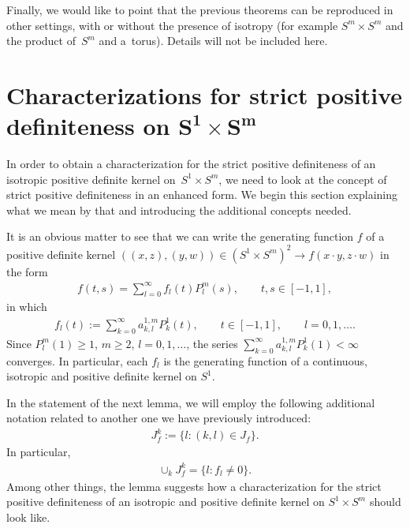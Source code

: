 \documentclass[pdftex]{sigma}
\numberwithin{equation}{section}
\begin{document}
Finally, we would like to point that the previous theorems can be reproduced in other settings, with or without the presence of isotropy (for example $S^m \times S^m$ and the product of~$S^m$ and a~torus). Details will not be included here.

\section[Characterizations for strict positive def\/initeness on $S^1 \times S^m$]{Characterizations for strict positive def\/initeness on $\boldsymbol{S^1 \times S^m}$}\label{section3}

In order to obtain a characterization for the strict positive def\/initeness of an isotropic positive def\/inite kernel on~$S^1 \times S^m$, we need to look at the concept of strict positive def\/initeness in an enhanced form. We begin this section explaining what we mean by that and introducing the additional concepts needed.

It is an obvious matter to see that we can write the generating function $f$ of a positive def\/inite kernel $((x,z), (y,w)) \in (S^1 \times S^m)^2 \to f(x \cdot y, z \cdot w)$ in the form
\begin{gather} \label{alter}
f(t,s)=\sum_{l=0}^{\infty}f_l(t)P_{l}^{m}(s), \qquad t,s \in [-1,1],
\end{gather}
in which
\begin{gather*}f_l(t):=\sum_{k=0}^\infty a_{k,l}^{1,m}P_{k}^1(t), \qquad t \in [-1,1],\qquad l=0,1,\ldots.\end{gather*}
Since $P_l^m(1)\geq 1$, $m\geq 2$, $l=0,1,\ldots$, the series $\sum\limits_{k=0}^\infty a_{k,l}^{1,m}P_{k}^1(1)<\infty$ converges. In particular, each $f_l$ is the generating function of a continuous, isotropic and positive def\/inite kernel on $S^1$.

In the statement of the next lemma, we will employ the following additional notation related to another one we have previously introduced:
\begin{gather*}J_{f}^k:=\{l\colon (k,l) \in J_f \}.\end{gather*}
In particular,
\begin{gather*}\cup_{k} J_f^k=\{l\colon f_l\neq 0\}.\end{gather*}
Among other things, the lemma suggests how a characterization for the strict positive def\/ini\-te\-ness of an isotropic and positive def\/inite kernel on $S^1 \times S^m$ should look like.
\end{document}
